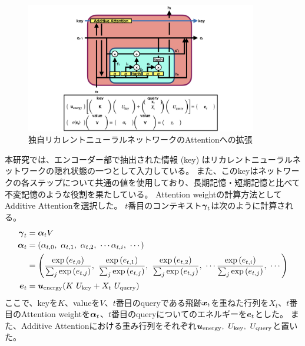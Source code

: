 \begin{figure}[htbp]
 \centering
 \includegraphics[trim = 100 0 100 0, width=0.9\textwidth, clip]{Figure/3Networks/3-4-1-5AttentionVLSTM.png}
 \caption{独自リカレントニューラルネットワークのAttentionへの拡張}
 \label{3-4-1-5AttentionVLSTM}
\end{figure}

本研究では、エンコーダー部で抽出された情報 (key) はリカレントニューラルネットワークの隠れ状態の一つとして入力している。
また、このkeyはネットワークの各ステップについて共通の値を使用しており、長期記憶・短期記憶と比べて不変記憶のような役割を果たしている。
Attention weightの計算方法としてAdditive Attentionを選択した。
$t$番目のコンテキスト${\mbox{\boldmath{$\gamma$}}}_{t}$は次のように計算される。
\begin{equation}
 \begin{split}
  {\mbox{\boldmath{$\gamma$}}}_{t} 
  &= {\mbox{\boldmath{$\alpha$}}}_{t} V\\
  {\mbox{\boldmath{$\alpha$}}}_{t}
  &= (\alpha_{t,0},\ \alpha_{t,1},\ \alpha_{t,2},\ \cdots \alpha_{t,i},\ \cdots) \\
  &= \left(\frac{\exp{({{e}}_{t,0})}}{\sum_j \exp{({{e}}_{t,j})}},\ \frac{\exp{({{e}}_{t,1})}}{\sum_j \exp{({{e}}_{t,j})}},\ \frac{\exp{({{e}}_{t,2})}}{\sum_j \exp{({{e}}_{t,j})}},\  \cdots \frac{\exp{({{e}}_{t,i})}}{\sum_j \exp{({{e}}_{t,j})}},\ \cdots\right)\\
  {\mbox{\boldmath{$e$}}}_{t}
  &={\mbox{\boldmath{$u$}}}_{\rm energy} (K\ U_{\rm key} + X_t\ U_{\rm query}) \\
 \end{split}
\end{equation}
ここで、keyを$K$、valueを$V$、$t$番目のqueryである飛跡${\mbox{\boldmath{$x$}}}_{t}$を重ねた行列を$X_t$、$t$番目のAttention weightを${\mbox{\boldmath{$\alpha$}}}_{t}$、$t$番目のqueryについてのエネルギーを${\mbox{\boldmath{$e$}}}_{t}$とした。
また、Additive Attentionにおける重み行列をそれぞれ${\mbox{\boldmath{$u$}}}_{\rm energy},\  U_{\rm key},\ U_{\rm query}$と置いた。

